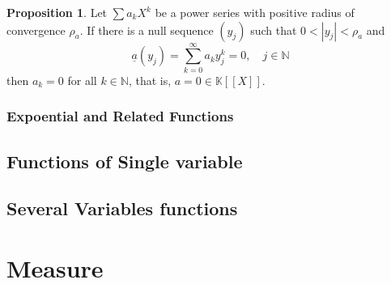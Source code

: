 \documentclass[12pt,a4paper]{book}
\theoremstyle{definition}
\newtheorem{prop}[defn]{Proposition}
\begin{document}
\begin{prop}
    Let $\sum a_k X^k$ be a power series with positive radius of convergence $\rho_a$. If there is a null sequence $\left(y_j\right)$ such that $0<\left|y_j\right|<\rho_a$ and
    $$
    \underline{a}\left(y_j\right)=\sum_{k=0}^{\infty} a_k y_j^k=0, \quad j \in \mathbb{N}
    $$
    then $a_k=0$ for all $k \in \mathbb{N}$, that is, $a=0 \in \mathbb{K} [[X]]$.
\end{prop}
\subsection{Expoential and Related Functions}


\newpage
\section{Functions of Single variable}





\newpage


\section{Several Variables functions}










\chapter{Measure}
\end{document}

